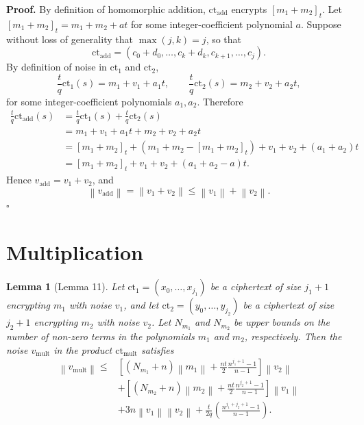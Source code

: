 \documentclass[11pt]{article}
\newtheorem{lemma}{Lemma}
\newcommand{\norm}[1]{\left\lVert #1\right\rVert}
\newcommand{\ct}{\mathrm{ct}}
\newcommand{\ctadd}{\mathrm{ct}_{\mathrm{add}}}
\newcommand{\ctmult}{\mathrm{ct}_{\mathrm{mult}}}
\newcommand{\vadd}{v_{\mathrm{add}}}
\newcommand{\vmult}{v_{\mathrm{mult}}}
\begin{document}
\textbf{Proof.}
By definition of homomorphic addition, $\ctadd$ encrypts $[m_1+m_2]_t$.
Let $[m_1+m_2]_t=m_1+m_2+at$ for some integer-coefficient polynomial $a$.
Suppose without loss of generality that $\max(j,k)=j$, so that
\[
  \ctadd=(c_0+d_0,\ldots,c_k+d_k,c_{k+1},\ldots,c_j).
\]
By definition of noise in $\ct_1$ and $\ct_2$,
\[
  \frac{t}{q}\ct_1(s)=m_1+v_1+a_1t,\qquad
  \frac{t}{q}\ct_2(s)=m_2+v_2+a_2t,
\]
for some integer-coefficient polynomials $a_1,a_2$. Therefore
\begin{align*}
\frac{t}{q}\ctadd(s)
&=\frac{t}{q}\ct_1(s)+\frac{t}{q}\ct_2(s)\\
&=m_1+v_1+a_1t+m_2+v_2+a_2t\\
&=[m_1+m_2]_t+(m_1+m_2-[m_1+m_2]_t)+v_1+v_2+(a_1+a_2)t\\
&=[m_1+m_2]_t+v_1+v_2+(a_1+a_2-a)t.
\end{align*}
Hence $\vadd=v_1+v_2$, and
\[
  \norm{\vadd}=\norm{v_1+v_2}
  \leq \norm{v_1}+\norm{v_2}.
\]
\hfill$\square$

\section*{Multiplication}

\begin{lemma}[Lemma 11]
Let $\ct_1=(x_0,\ldots,x_{j_1})$ be a ciphertext of size $j_1+1$
encrypting $m_1$ with noise $v_1$, and let
$\ct_2=(y_0,\ldots,y_{j_2})$ be a ciphertext of size $j_2+1$
encrypting $m_2$ with noise $v_2$. Let $N_{m_1}$ and $N_{m_2}$
be upper bounds on the number of non-zero terms in the polynomials
$m_1$ and $m_2$, respectively. Then the noise $\vmult$ in the product
$\ctmult$ satisfies
\begin{align*}
\norm{\vmult}\leq{}&
\left[
 (N_{m_1}+n)\norm{m_1}
 +\frac{nt}{2}\frac{n^{j_1+1}-1}{n-1}
\right]\norm{v_2}\\
&+\left[
 (N_{m_2}+n)\norm{m_2}
 +\frac{nt}{2}\frac{n^{j_2+1}-1}{n-1}
\right]\norm{v_1}\\
&+3n\norm{v_1}\norm{v_2}
 +\frac{t}{2q}\left(\frac{n^{j_1+j_2+1}-1}{n-1}\right).
\end{align*}
\end{lemma}
\end{document}
